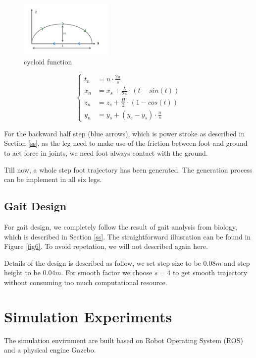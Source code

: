 \documentclass[conference]{IEEEtran}
\begin{document}
\begin{figure}
    \centerline{\includegraphics[width=0.4\textwidth]{traj.png}}
    \caption{cycloid function}
    \label{fig5}
\end{figure}

\begin{equation}
    \begin{cases}
    t_n &= n \cdot \frac{2\pi}{s}\\
    x_n &= x_s+\frac{L}{2\pi} \cdot(t- sin(t))\\
    z_n &= z_s+\frac{H}{2}\cdot(1- cos(t))\\
    y_n &= y_s + (y_e - y_s)\cdot \frac{n}{s}    
    \end{cases}
\end{equation}

For the backward half step (blue arrows), which is power stroke as described in Section \ref{ss}, as the leg need to make use of the friction between foot and ground to act force in joints, we need foot always contact with the ground.

Till now, a whole step foot trajectory has been generated. The generation process can be implement in all six legs.

\subsection{Gait Design}

For gait design, we completely follow the result of gait analysis from biology, which is described in Section \ref{ss}. The straightforward illusration can be found in Figure \ref{fig6}. To avoid repetation, we will not described again here.

Details of the design is described as follow, we set step size to be \(0.08m\) and step height to be \(0.04m\). For smooth factor we choose \(s=4\) to get smooth trajectory without consuming too much computational resource.

\section{Simulation Experiments}\label{s5}
The simulation envirnment are built based on Robot Operating System (ROS) and a physical engine Gazebo.
\end{document}
